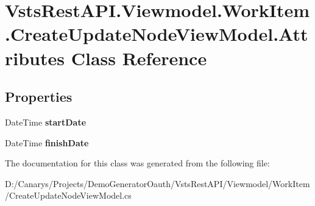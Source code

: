 \hypertarget{class_vsts_rest_a_p_i_1_1_viewmodel_1_1_work_item_1_1_create_update_node_view_model_1_1_attributes}{}\section{Vsts\+Rest\+A\+P\+I.\+Viewmodel.\+Work\+Item.\+Create\+Update\+Node\+View\+Model.\+Attributes Class Reference}
\label{class_vsts_rest_a_p_i_1_1_viewmodel_1_1_work_item_1_1_create_update_node_view_model_1_1_attributes}
\subsection*{Properties}
\begin{DoxyCompactItemize}
\item 
\mbox{\label{class_vsts_rest_a_p_i_1_1_viewmodel_1_1_work_item_1_1_create_update_node_view_model_1_1_attributes_a566c22ea34bb8728474727260ac4e8d0}} 
Date\+Time {\bfseries start\+Date}
\item 
\mbox{\label{class_vsts_rest_a_p_i_1_1_viewmodel_1_1_work_item_1_1_create_update_node_view_model_1_1_attributes_aaf82c7b004efa8872f2eea6a4a204618}} 
Date\+Time {\bfseries finish\+Date}
\end{DoxyCompactItemize}


The documentation for this class was generated from the following file\+:\begin{DoxyCompactItemize}
\item 
D\+:/\+Canarys/\+Projects/\+Demo\+Generator\+Oauth/\+Vsts\+Rest\+A\+P\+I/\+Viewmodel/\+Work\+Item/Create\+Update\+Node\+View\+Model.\+cs\end{DoxyCompactItemize}
